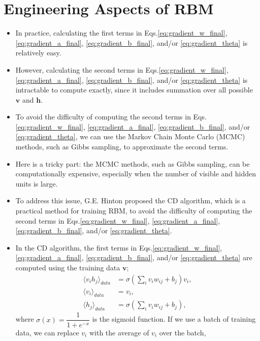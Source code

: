 \documentclass[10pt, a4paper]{article}
\begin{document}
\section{Engineering Aspects of RBM}
\begin{itemize}
  \item In practice, calculating the first terms in Eqs.\eqref{eq:gradient_w_final},
    \eqref{eq:gradient_a_final}, \eqref{eq:gradient_b_final}, and/or \eqref{eq:gradient_theta}
    is relatively easy.
  \item However, calculating the second terms in Eqs.\eqref{eq:gradient_w_final},
    \eqref{eq:gradient_a_final}, \eqref{eq:gradient_b_final}, and/or 
    \eqref{eq:gradient_theta} is intractable to compute exactly, 
    since it includes summation over all possible $\mathbf{v}$ and $\mathbf{h}$.
  \item To avoid the difficulty of computing the second terms in Eqs.\eqref{eq:gradient_w_final},
    \eqref{eq:gradient_a_final}, \eqref{eq:gradient_b_final}, and/or \eqref{eq:gradient_theta},
    we can use the Markov Chain Monte Carlo (MCMC) methods, such as Gibbs sampling,
    to approximate the second terms.
  \item Here is a tricky part: the MCMC methods, such as Gibbs sampling,
    can be computationally expensive, especially when the number of visible 
    and hidden units is large.
  \item To address this issue, G.E. Hinton proposed the CD algorithm,
    which is a practical method for training RBM, to avoid the difficulty
    of computing the second terms in Eqs.\eqref{eq:gradient_w_final},
    \eqref{eq:gradient_a_final}, \eqref{eq:gradient_b_final},  and/or \eqref{eq:gradient_theta}.
  \item In the CD algorithm, the first terms in Eqs.\eqref{eq:gradient_w_final},
    \eqref{eq:gradient_a_final}, \eqref{eq:gradient_b_final}, and/or \eqref{eq:gradient_theta}
    are computed using the training data $\mathbf{v}$;
    \begin{align}
    \langle v_i h_j \rangle_{data} &= \sigma\left(\sum_i v_{i}w_{ij} + b_j\right) v_i, \nonumber \\
    \langle v_i \rangle_{data} &= v_i, \nonumber \\
    \langle h_j \rangle_{data} &= \sigma\left(\sum_i v_{i}w_{ij} + b_j\right),
    \label{eq:hidden_cond_prob_final}
    \end{align}
    where $\sigma(x) = \dfrac{1}{1 + e^{-x}}$ is the sigmoid function. If we use a batch 
    of training data, we can replace $v_i$ with the average of $v_i$ over the batch,

\end{itemize}
\end{document}
